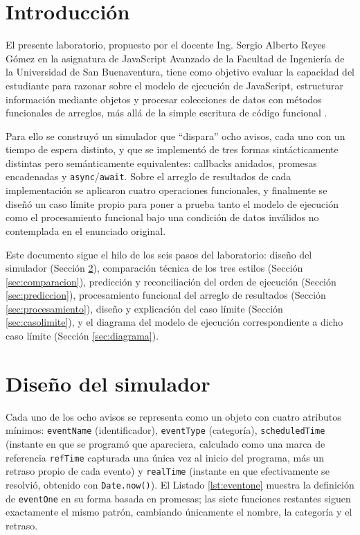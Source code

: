 \documentclass[conference,a4paper]{IEEEtran}
\begin{document}
\section{Introducci\'on}
El presente laboratorio, propuesto por el docente Ing. Sergio Alberto Reyes G\'omez en la asignatura de JavaScript Avanzado de la Facultad de Ingenier\'ia de la Universidad de San Buenaventura, tiene como objetivo evaluar la capacidad del estudiante para razonar sobre el modelo de ejecuci\'on de JavaScript, estructurar informaci\'on mediante objetos y procesar colecciones de datos con m\'etodos funcionales de arreglos, m\'as all\'a de la simple escritura de c\'odigo funcional \cite{lab_enunciado}.

Para ello se construy\'o un simulador que ``dispara'' ocho avisos, cada uno con un tiempo de espera distinto, y que se implement\'o de tres formas sint\'acticamente distintas pero sem\'anticamente equivalentes: callbacks anidados, promesas encadenadas y \texttt{async}/\texttt{await}. Sobre el arreglo de resultados de cada implementaci\'on se aplicaron cuatro operaciones funcionales, y finalmente se dise\~n\'o un caso l\'imite propio para poner a prueba tanto el modelo de ejecuci\'on como el procesamiento funcional bajo una condici\'on de datos inv\'alidos no contemplada en el enunciado original.

Este documento sigue el hilo de los seis pasos del laboratorio: dise\~no del simulador (Secci\'on \ref{sec:diseno}), comparaci\'on t\'ecnica de los tres estilos (Secci\'on \ref{sec:comparacion}), predicci\'on y reconciliaci\'on del orden de ejecuci\'on (Secci\'on \ref{sec:prediccion}), procesamiento funcional del arreglo de resultados (Secci\'on \ref{sec:procesamiento}), dise\~no y explicaci\'on del caso l\'imite (Secci\'on \ref{sec:casolimite}), y el diagrama del modelo de ejecuci\'on correspondiente a dicho caso l\'imite (Secci\'on \ref{sec:diagrama}).

\section{Dise\~no del simulador}
\label{sec:diseno}
Cada uno de los ocho avisos se representa como un objeto con cuatro atributos m\'inimos: \texttt{eventName} (identificador), \texttt{eventType} (categor\'ia), \texttt{scheduledTime} (instante en que se program\'o que apareciera, calculado como una marca de referencia \texttt{refTime} capturada una \'unica vez al inicio del programa, m\'as un retraso propio de cada evento) y \texttt{realTime} (instante en que efectivamente se resolvi\'o, obtenido con \texttt{Date.now()}). El Listado \ref{lst:eventone} muestra la definici\'on de \texttt{eventOne} en su forma basada en promesas; las siete funciones restantes siguen exactamente el mismo patr\'on, cambiando \'unicamente el nombre, la categor\'ia y el retraso.
\end{document}
